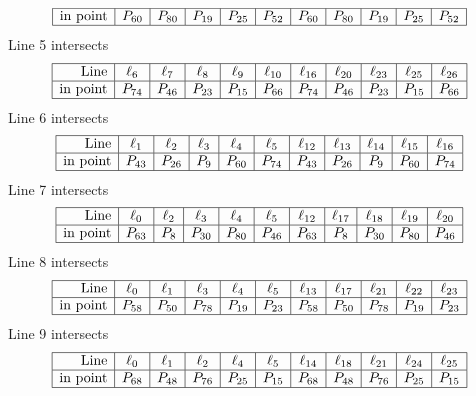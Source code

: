 \documentclass{article}
\begin{document}
{$$\begin{array}{|r*{10}{|c}|}
\hline
\mbox{in point}  & P_{60} & P_{80} & P_{19} & P_{25} & P_{52} & P_{60} & P_{80} & P_{19} & P_{25} & P_{52}\\
\hline
\end{array}
$$
Line 5 intersects 
$$
\begin{array}{|r*{10}{|c}|}
\hline
\mbox{Line}  & \ell_{6} & \ell_{7} & \ell_{8} & \ell_{9} & \ell_{10} & \ell_{16} & \ell_{20} & \ell_{23} & \ell_{25} & \ell_{26}\\
\hline
\mbox{in point}  & P_{74} & P_{46} & P_{23} & P_{15} & P_{66} & P_{74} & P_{46} & P_{23} & P_{15} & P_{66}\\
\hline
\end{array}
$$
Line 6 intersects 
$$
\begin{array}{|r*{10}{|c}|}
\hline
\mbox{Line}  & \ell_{1} & \ell_{2} & \ell_{3} & \ell_{4} & \ell_{5} & \ell_{12} & \ell_{13} & \ell_{14} & \ell_{15} & \ell_{16}\\
\hline
\mbox{in point}  & P_{43} & P_{26} & P_{9} & P_{60} & P_{74} & P_{43} & P_{26} & P_{9} & P_{60} & P_{74}\\
\hline
\end{array}
$$
Line 7 intersects 
$$
\begin{array}{|r*{10}{|c}|}
\hline
\mbox{Line}  & \ell_{0} & \ell_{2} & \ell_{3} & \ell_{4} & \ell_{5} & \ell_{12} & \ell_{17} & \ell_{18} & \ell_{19} & \ell_{20}\\
\hline
\mbox{in point}  & P_{63} & P_{8} & P_{30} & P_{80} & P_{46} & P_{63} & P_{8} & P_{30} & P_{80} & P_{46}\\
\hline
\end{array}
$$
Line 8 intersects 
$$
\begin{array}{|r*{10}{|c}|}
\hline
\mbox{Line}  & \ell_{0} & \ell_{1} & \ell_{3} & \ell_{4} & \ell_{5} & \ell_{13} & \ell_{17} & \ell_{21} & \ell_{22} & \ell_{23}\\
\hline
\mbox{in point}  & P_{58} & P_{50} & P_{78} & P_{19} & P_{23} & P_{58} & P_{50} & P_{78} & P_{19} & P_{23}\\
\hline
\end{array}
$$
Line 9 intersects 
$$
\begin{array}{|r*{10}{|c}|}
\hline
\mbox{Line}  & \ell_{0} & \ell_{1} & \ell_{2} & \ell_{4} & \ell_{5} & \ell_{14} & \ell_{18} & \ell_{21} & \ell_{24} & \ell_{25}\\
\hline
\mbox{in point}  & P_{68} & P_{48} & P_{76} & P_{25} & P_{15} & P_{68} & P_{48} & P_{76} & P_{25} & P_{15}\\
\hline
\end{array}
$$}
\end{document}
